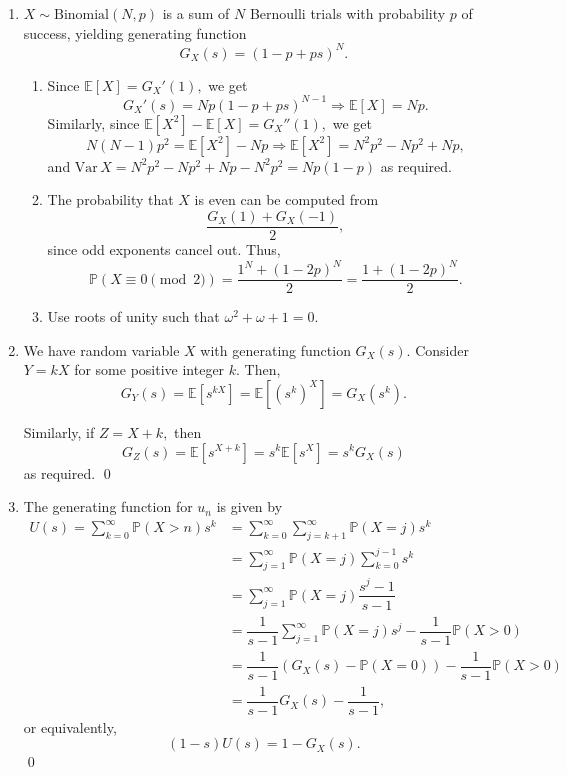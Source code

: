 \documentclass[12p]{article}
\begin{document}
\begin{enumerate}
  \item $X \sim \text{Binomial}(N, p)$ is a sum of $N$ Bernoulli
    trials with probability $p$ of success, yielding generating function
    $$
    G_X(s) = (1-p + ps)^N.
    $$

    \begin{enumerate}
      \item Since $\mathbb E[X] = G_X'(1),$ we get
        $$
        G_X'(s) = Np(1-p + ps)^{N-1} \Rightarrow \mathbb E[X] = Np.
        $$
        Similarly, since $\mathbb E[X^2] - \mathbb E[X] = G_X''(1),$ we get
        $$
        N(N-1) p^2 = \mathbb E[X^2] - Np \Rightarrow \mathbb E[X^2] =
        N^2p^2 - Np^2 + Np,
        $$
        and $\text{Var}\,X = N^2p^2 - Np^2 + Np - N^2p^2 = Np(1-p)$ as required.

      \item The probability that $X$ is even can be computed from
        $$
        \frac{G_X(1) + G_X(-1)}{2},
        $$
        since odd exponents cancel out. Thus,
        $$
        \mathbb P(X \equiv 0 \pmod 2) = \dfrac{1^N + (1-2p)^N}{2} =
        \dfrac{1 + (1-2p)^N}{2}.
        $$

      \item Use roots of unity such that $\omega^2 + \omega + 1 = 0.$
    \end{enumerate}

  \item We have random variable $X$ with generating function
    $G_X(s).$ Consider $Y = kX$ for some positive integer $k.$ Then,
    $$
    G_{Y}(s) = \mathbb E[s^{kX}] = \mathbb E[(s^k)^X] = G_X(s^k).
    $$

    Similarly, if $Z = X + k,$ then $$
    G_Z(s) = \mathbb E[s^{X + k}] = s^k \mathbb E[s^X] = s^k G_X(s)
    $$
    as required. \qed

  \item The generating function for $u_n$ is given by
    \begin{align*}
      U(s) = \sum_{k = 0}^{\infty} \mathbb P(X > n) s^k &= \sum_{k =
      0}^{\infty} \sum_{j = k + 1}^{\infty} \mathbb P(X = j) s^k \\
      &=\sum_{j = 1}^{\infty} \mathbb P(X = j) \sum_{k = 0}^{j - 1} s^k \\
      &= \sum_{j =1 }^\infty{} \mathbb P(X = j) \dfrac{s^{j} - 1}{s - 1} \\
      &= \dfrac{1}{s-1} \sum_{j = 1}^{\infty} \mathbb P(X =j) s^j -
      \dfrac{1}{s-1} \mathbb P(X > 0) \\
      &= \dfrac{1}{s-1} (G_X(s) - \mathbb P(X = 0)) - \dfrac{1}{s-1}
      \mathbb P(X > 0) \\
      &= \dfrac{1}{s-1} G_X(s) - \dfrac{1}{s-1},
    \end{align*}
    or equivalently, $$
    (1-s) U(s) = 1 - G_X(s).
    $$ \qed


\end{enumerate}
\end{document}
